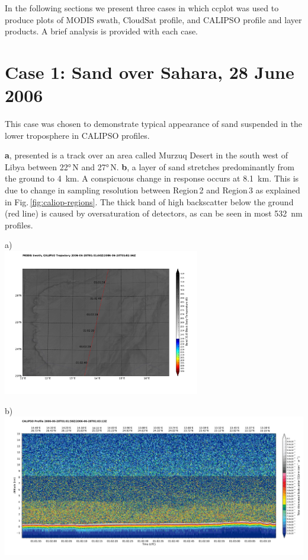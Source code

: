 \sffamily\small
In the following sections we present three cases in which ccplot was used to produce plots of MODIS swath, CloudSat profile,
and CALIPSO profile and layer products. A brief analysis is provided with each case.

\section*{Case 1: Sand over Sahara, 28 June 2006}
This case was chosen to demonstrate typical appearance of sand suspended in the lower troposphere in CALIPSO profiles.
\vspace{3mm}

\noindent
\begin{minipage}[t]{60mm}
\textbf{a}, presented is a track over an area called Murzuq Desert in the south west of Libya between \ang{22}\,N and \ang{27}\,N. 
\textbf{b}, a layer of sand stretches predominantly from the ground to \SI{4}{km}. A conspicuous change in response occurs at \SI{8.1}{km}. This is due to change in sampling resolution between Region\,2 and Region\,3 as explained in Fig.\,\ref{fig:caliop-regions}. The thick band of high backscatter below the ground (red line) is caused by oversaturation of detectors, as can be seen in most \SI{532}{nm} profiles.
\end{minipage}\hfill
\begin{minipage}[t]{86mm}
\textsf{\small a)}\\
\includegraphics[width=86mm,clip,trim=10mm 10mm 4mm 4mm]{images/sahara/orbit-modis_x31+calipso.pdf}\\
\end{minipage}
\vspace{3mm}

\noindent\textsf{\small b)}\\
\includegraphics[width=150mm,clip,trim=10mm 10mm 4mm 4mm]{images/sahara/1calipso532.pdf}

